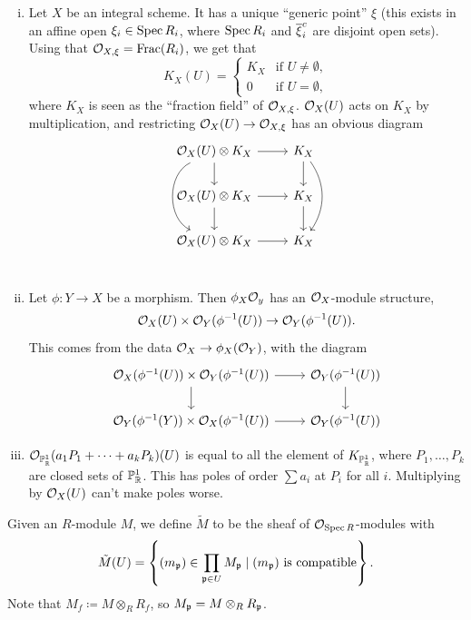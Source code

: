 \begin{enumerate}[(i)]
    \item Let $X$ be an integral scheme. It has a unique ``generic point'' $\xi$ (this exists in an affine open $\xi_i \in \operatorname{Spec} R_i$, where $\operatorname{Spec} R_i$ and $\overline \xi_i^c$ are disjoint open sets). Using that $\mathcal O_{X, \xi} = \operatorname{Frac}(R_i)$, we get that
    \[ K_X(U) = \begin{cases} K_X & \text{if $U \neq \emptyset$}, \\ 0 & \text{if $U = \emptyset$}, \end{cases} \]
    where $K_X$ is seen as the ``fraction field'' of $\mathcal O_{X,\xi}$. $\mathcal O_X(U)$ acts on $K_X$ by multiplication, and restricting $\mathcal O_X(U) \to \mathcal O_{X,\xi}$ has an obvious diagram
    \[ \begin{tikzcd} 
        \SO_X(U) \otimes K_X \arrow[r] \arrow[d] \arrow[dd, bend right = 65] & K_X \arrow[d] \arrow[dd, bend left = 35] \\
        \SO_X(U) \otimes K_X \arrow[r] \arrow[d] & K_X \arrow[d] \\
        \SO_X(U) \otimes K_X \arrow[r] & K_X \\
    \end{tikzcd} \]
    \vspace{-36pt}
    \item Let $\phi \colon Y \to X$ be a morphism. Then $\phi_X \mathcal O_y$ has an $\mathcal O_X$-module structure,
    \[ \mathcal O_X(U) \times \mathcal O_Y(\phi^{-1}(U)) \to \mathcal O_Y(\phi^{-1}(U)). \]
    This comes from the data $\mathcal O_X \to \phi_X(\mathcal O_Y)$, with the diagram
    \[ \begin{tikzcd}
        \SO_X(\phi\inv(U)) \times \SO_Y(\phi\inv(U)) \arrow[d] \arrow[r] & \SO_Y(\phi\inv(U)) \arrow[d] \\
        \SO_Y(\phi\inv(Y)) \times \SO_X(\phi\inv(U)) \arrow[r] & \SO_Y(\phi\inv(U))
    \end{tikzcd} \]
    \item $\mathcal O_{\mathbb P_\mathbb R^1}(a_1 P_1 + \dots + a_k P_k) (U)$ is equal to all the element of $K_{\mathbb P_\mathbb R^1}$, where $P_1, \dots, P_k$ are closed sets of $\mathbb P_\mathbb R^1$. This has poles of order $\sum a_i$ at $P_i$ for all $i$. Multiplying by $\mathcal O_X(U)$ can't make poles worse.
\end{enumerate}

\newpage
\begin{definition} \label{defn:sheaf_of_modules} %
    Given an $R$-module $M$, we define $\tilde M$ to be the sheaf of $\mathcal O_{\operatorname{Spec} R}$-modules with
    \[ \tilde M(U) = \left\{(m_\mathfrak p) \in \prod_{\mathfrak p \in U} M_{\mathfrak p} \mid (m_\mathfrak p) \text{ is compatible} \right\}. \]
    Note that $M_f \coloneq M \otimes_R R_f$, so $M_\mathfrak p = M \otimes_R R_\mathfrak p$.
\end{definition}

